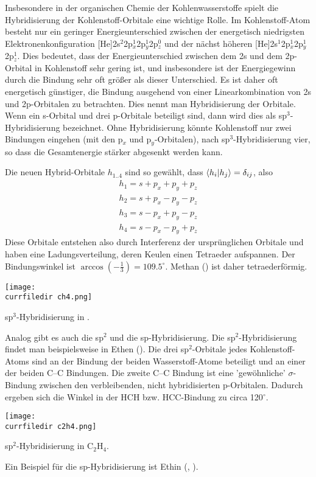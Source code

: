 Insbesondere in der organischen Chemie der Kohlenwasserstoffe spielt die Hybridisierung der Kohlenstoff-Orbitale eine wichtige Rolle. Im Kohlenstoff-Atom besteht nur ein geringer Energieunterschied zwischen der energetisch niedrigsten Elektronenkonfiguration
[He]2s$^2$2p$_x^1$2p$_y^1$2p$_z^0$ und der nächst höheren [He]2s$^1$2p$_x^1$2p$_y^1$2p$_z^1$. Dies bedeutet, dass der Energieunterschied zwischen dem 2s und dem 2p-Orbital in Kohlenstoff sehr gering ist, und insbesondere 
ist der Energiegewinn durch die Bindung sehr oft größer als dieser Unterschied. Es ist daher oft energetisch günstiger, die Bindung ausgehend von einer Linearkombination von 2s und 2p-Orbitalen zu betrachten. Dies nennt man Hybridisierung der Orbitale. Wenn ein s-Orbital und drei p-Orbitale beteiligt sind, dann wird dies als sp$^3$-Hybridisierung bezeichnet. Ohne Hybridisierung könnte Kohlenstoff nur zwei Bindungen eingehen (mit den p$_x$ und p$_y$-Orbitalen), nach sp$^3$-Hybridisierung vier, so dass die Gesamtenergie stärker abgesenkt werden kann.

Die neuen Hybrid-Orbitale $h_{1 .. 4}$ sind so gewählt, dass $\braket{h_i | h_j} = \delta_{ij}$, also
\begin{eqnarray}
 h_1 = s + p_x + p_y + p_z \\
 h_2 = s + p_x - p_y - p_z \\
 h_3 = s - p_x + p_y - p_z \\
 h_4 = s - p_x - p_y + p_z 
\end{eqnarray}
Diese Orbitale entstehen also durch Interferenz der ursprünglichen Orbitale und haben eine Ladungsverteilung, deren Keulen einen Tetraeder aufspannen. Der Bindungswinkel ist $\arccos (-\frac{1}{3}) = 109.5^\circ$. Methan () ist daher tetraederförmig.
%
\begin{marginfigure}
\texttt{[image: \\currfiledir ch4.png]}
\caption{sp$^3$-Hybridisierung in . }
\end{marginfigure}
%


Analog gibt es auch die sp$^2$ und die sp-Hybridisierung.  Die sp$^2$-Hybridisierung findet man beispielsweise in Ethen (). Die drei  sp$^2$-Orbitale jedes Kohlenstoff-Atoms sind an der Bindung der beiden Wasserstoff-Atome beteiligt und an einer der beiden C--C Bindungen. Die zweite C--C Bindung ist eine 'gewöhnliche' $\sigma$-Bindung zwischen den verbleibenden, nicht hybridisierten p-Orbitalen. Dadurch ergeben sich die Winkel in der HCH bzw. HCC-Bindung zu circa 120$^\circ$.
%
\begin{marginfigure}
\texttt{[image: \\currfiledir c2h4.png]}
\caption{sp$^2$-Hybridisierung in C$_2$H$_4$. }
\end{marginfigure}
%

Ein Beispiel für die sp-Hybridisierung ist Ethin (,  ).

\printbibliography[segment=\therefsegment,heading=subbibliography]
